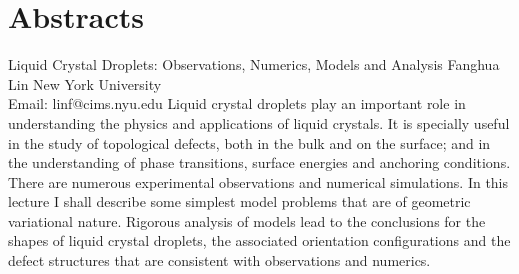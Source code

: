 \documentclass[
	openany, %
	parskip=full, %
	12pt, %
	a4paper, %
]{conferencebooklet} %
\begin{document}





\chapter{Abstracts}

\abstract
    {Liquid Crystal Droplets:  Observations, Numerics, Models and Analysis    }
    {Fanghua  Lin}
    {}
    {New York University\\
    Email: linf@cims.nyu.edu}
    {Liquid crystal droplets play an important role in understanding the physics and applications of liquid crystals. It is specially useful in the study of topological defects, both in the bulk and on the surface;  and in the understanding of phase transitions,  surface energies and anchoring conditions.  There are numerous experimental observations and numerical simulations. In this lecture I shall describe some simplest model problems that are of geometric variational nature. Rigorous analysis of models  lead to the conclusions for the shapes of liquid crystal droplets, the associated orientation configurations and the defect structures that are consistent with observations and numerics.}
\end{document}
